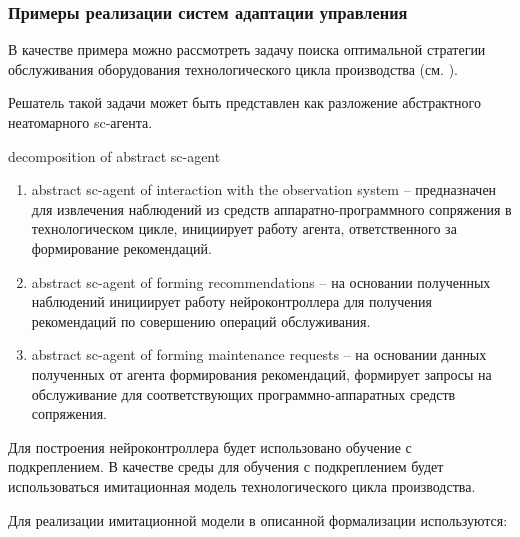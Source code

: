 \subsubsection{Примеры реализации систем адаптации управления}
\label{sec_chapter_enterprise_control_adaptation_examples}


В качестве примера можно рассмотреть задачу поиска оптимальной стратегии обслуживания оборудования технологического цикла производства (см. ).

Решатель такой задачи может быть представлен как разложение абстрактного неатомарного sc-агента.

\begin{SCn}
\begin{scnrelfromset}{decomposition of abstract sc-agent}
\end{scnrelfromset}
\end{SCn}

\begin{enumerate}
    \item abstract sc-agent of interaction with the observation system – предназначен для извлечения наблюдений из средств аппаратно-программного сопряжения в технологическом цикле, инициирует работу агента, ответственного за формирование рекомендаций.
    \item abstract sc-agent of forming recommendations – на основании полученных наблюдений инициирует работу нейроконтроллера для получения рекомендаций по совершению операций обслуживания.
    \item abstract sc-agent of forming maintenance requests – на основании данных полученных от агента формирования рекомендаций, формирует запросы на обслуживание для соответствующих программно-аппаратных средств сопряжения.

\end{enumerate}

Для построения нейроконтроллера будет использовано обучение с подкреплением. В качестве среды для обучения с подкреплением будет использоваться имитационная модель технологического цикла производства.

Для реализации имитационной модели в описанной формализации используются:



